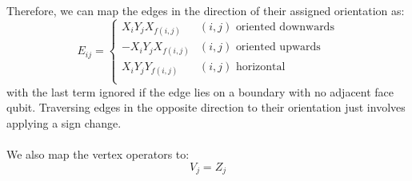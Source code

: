 \documentclass[twoside]{article}
\begin{document}
   Therefore, we can map the edges in the direction of their assigned orientation as:
\begin{equation}
                E_{ij} = \begin{cases}
                        X_i Y_j X_{f(i,j)} & (i,j) \text{ oriented downwards}\\
                        -X_i Y_j X_{f(i,j)} & (i,j) \text{ oriented upwards}\\
                        X_i Y_j Y_{f(i,j)} & (i,j) \text{ horizontal}\\
                \end{cases}
        \end{equation}
        with the last term ignored if the edge lies on a boundary with no adjacent face qubit. Traversing edges in the opposite direction to their orientation just involves applying a sign change. \\\\We also map the vertex operators to:
        \begin{equation}
                V_j = Z_j
        \end{equation}
\end{document}
